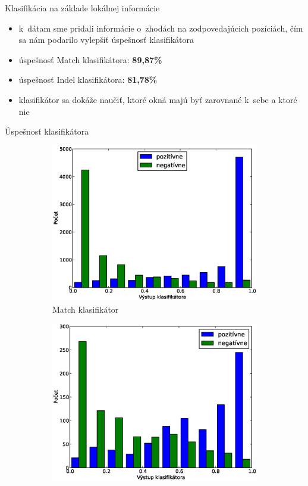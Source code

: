 \documentclass[xcolor=dvipsnames, compress, 12pt]{beamer}
\theoremstyle{definition}
\begin{document}
\begin{frame}{Klasifikácia na základe lokálnej informácie}
  \begin{itemize}
    \item k~dátam sme pridali informácie o~zhodách na zodpovedajúcich pozíciách, čím sa nám podarilo vylepšiť úspešnosť klasifikátora
    \item úspešnosť Match klasifikátora: \textbf{89,87\%}
    \item úspešnosť Indel klasifikátora: \textbf{81,78\%}
    \item klasifikátor sa dokáže naučiť, ktoré okná majú byť zarovnané k~sebe a ktoré nie
\end{itemize}
\end{frame}


\begin{frame}{Úspešnosť klasifikátora}
\begin{figure}[h]
        \centering
        \begin{subfigure}[b]{0.45\textwidth}
               \includegraphics[width=\textwidth]{images/randomforest_combined_5_test}
                \caption{Match klasifikátor}
        \end{subfigure}
        \qquad
        \begin{subfigure}[b]{0.45\textwidth}
                \includegraphics[width=\textwidth]{images/randomforest_combined_5_indel_test}

\end{subfigure}
\end{figure}
\end{frame}
\end{document}
